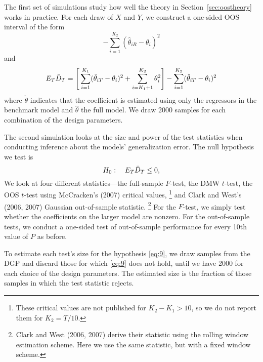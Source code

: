\documentclass[11pt]{article}
\begin{document}
The first set of simulations study how well the theory in
Section~\ref{sec:oostheory} works in practice.  For each draw of $X$
and $Y$, we construct a one-sided OOS interval of the
form
\begin{equation*}
  [ \oosA - 1.28 \hat{\sigma}, \infty) \quad\text{with}\quad
  \sh^2 = \frac1P \sum_{t=R+1}^T (D_t - \oosA)^{2}
\end{equation*}
for $P$ set to every 10th value between 1 and $2T/3$.  We calculate
the percentage of these intervals that contain $\E_R \oosA$ and that
contain $\E_T \oosB$.  Since the data are i.i.d., both of these
quantities are easy to calculate:
\begin{equation*}
  E_R \oosA = \Bigg[\sum_{i=1}^{K_1} (\tilde{\theta}_{iR} - \theta_i)^2 +
  \sum_{i=K_1+1}^{K_2}\theta_i^2\Bigg] - \sum_{i=1}^{K_2} (\hat{\theta}_{iR} -
  \theta_i)^2
\end{equation*}
and
\begin{equation*}
  E_T \bar{D}_{T} = \Bigg[\sum_{i=1}^{K_1} (\tilde{\theta}_{iT} - \theta_i)^2 +
  \sum_{i=K_1+1}^{K_2}\theta_i^2\Bigg] - \sum_{i=1}^{K_2} (\hat{\theta}_{iT} -
  \theta_i)^2
\end{equation*}
where $\tilde{\theta}$ indicates that the coefficient is estimated
using only the regressors in the benchmark model and $\hat{\theta}$
the full model.  We draw 2000 samples for each combination of the
design parameters.

The second simulation looks at the size and power of the test
statistics when conducting inference about the models' generalization
error.  The null hypothesis we test is
\begin{equation}\label{eq:9}
  H_0:\quad E_T \bar{D}_{T} \leq 0,
\end{equation}
We look at four different statistics---the full-sample $F$-test, the
DMW $t$-test, the
OOS $t$-test using McCracken's (2007)
critical values,%
\footnote{These critical values are not published for
  $K_2-K_1>10$, so we do not report them for $K_2 = T/10$.} %
and Clark and West's (2006, 2007) Gaussian out-of-sample
statistic.%
\footnote{Clark and West (2006, 2007) derive their statistic
using the rolling window estimation scheme.  Here we use the same
statistic, but with a fixed window scheme.} %
For the $F$-test, we simply test whether the coefficients on the larger
model are nonzero.  For the out-of-sample tests, we conduct a
one-sided test of out-of-sample performance for every 10th value of
$P$ as before.

To estimate each test's size for the hypothesis \eqref{eq:9}, we draw
samples from the DGP and discard those for which \eqref{eq:9} does
not hold, until we have 2000 for each choice of the design parameters.
The estimated size is the fraction of those samples in which the test
statistic rejects.
\end{document}
